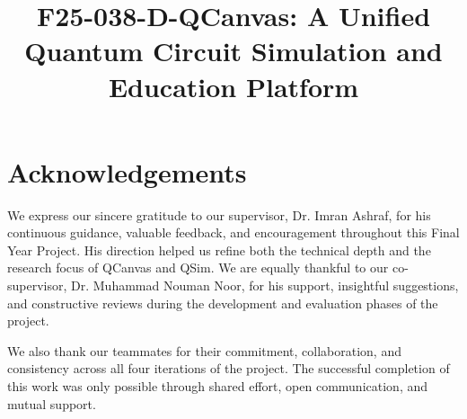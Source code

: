 \documentclass{fast-nuces-bs}
\title{F25-038-D-QCanvas: A Unified Quantum Circuit Simulation and Education Platform}
\begin{document}
\justifying

\renewcommand{\headrulewidth}{0pt}
\setlength{\headsep}{6pt}
\pagestyle{fancy}
\raggedbottom

\setlength{\textfloatsep}{10pt plus 2pt minus 2pt}
\setlength{\floatsep}{10pt plus 2pt minus 2pt}
\setlength{\intextsep}{10pt plus 2pt minus 2pt}


\makeatletter
{}
\makeatother

\renewcommand{\thesection}{\thechapter.\arabic{section}}
\renewcommand{\thesubsection}{\thesection.\arabic{subsection}}
\renewcommand{\thesubsubsection}{\thesubsection.\arabic{subsubsection}}

\chapter*{Acknowledgements}

We express our sincere gratitude to our supervisor, Dr. Imran Ashraf, for his continuous guidance, valuable feedback, and encouragement throughout this Final Year Project. His direction helped us refine both the technical depth and the research focus of QCanvas and QSim. We are equally thankful to our co-supervisor, Dr. Muhammad Nouman Noor, for his support, insightful suggestions, and constructive reviews during the development and evaluation phases of the project.

We also thank our teammates for their commitment, collaboration, and consistency across all four iterations of the project. The successful completion of this work was only possible through shared effort, open communication, and mutual support.
\end{document}
